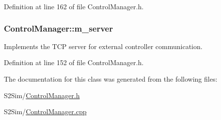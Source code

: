 Definition at line 162 of file Control\-Manager.\-h.

\hypertarget{class_control_manager_a1b71eabaeddfd8ec80e503b734c72e9d}{
\subsubsection[{m\-\_\-server}]{ Control\-Manager\-::m\-\_\-server\hspace{0.3cm}{\ttfamily [private]}}}\label{class_control_manager_a1b71eabaeddfd8ec80e503b734c72e9d}
Implements the T\-C\-P server for external controller communication. 

Definition at line 152 of file Control\-Manager.\-h.



The documentation for this class was generated from the following files\-:\begin{DoxyCompactItemize}
\item 
S2\-Sim/\hyperlink{_control_manager_8h}{Control\-Manager.\-h}\item 
S2\-Sim/\hyperlink{_control_manager_8cpp}{Control\-Manager.\-cpp}\end{DoxyCompactItemize}
